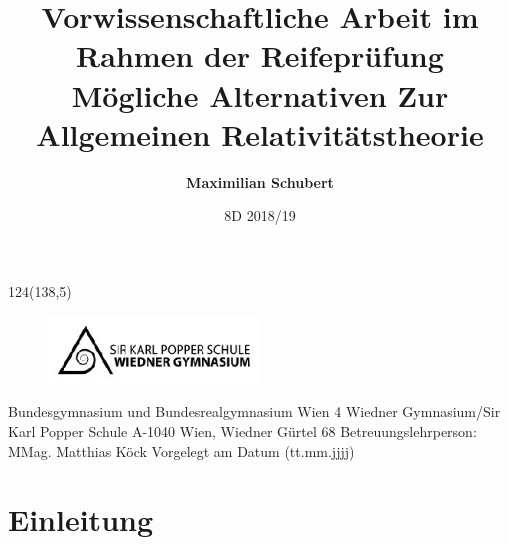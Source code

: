 \documentclass[a4paper,11pt]{article}
\author{\textbf{\Large{Maximilian Schubert}}}
\title{\large{Vorwissenschaftliche Arbeit im Rahmen der Reifeprüfung}\\\vspace{50mm}\textbf{\LARGE{Mögliche Alternativen Zur Allgemeinen Relativitätstheorie}}}
\date{\large{8D \hspace*{10mm} 2018/19}}
\begin{document}
\begin{titlingpage}
\singlespacing
\maketitle

\begin{textblock}{124}(138,5)
	\begin{figure}
	\includegraphics[width=160pt]{SKPLogo.eps}
	\end{figure}
\end{textblock}

\begin{center}
\vspace{96mm}
\large{
Bundesgymnasium und Bundesrealgymnasium Wien 4
\linebreak
Wiedner Gymnasium/Sir Karl Popper Schule
\linebreak
A-1040 Wien, Wiedner Gürtel 68
\vspace{10mm}
\linebreak
Betreuungslehrperson: MMag. Matthias Köck
\vspace{4mm}
\linebreak
Vorgelegt am Datum (tt.mm.jjjj)
}
\end{center}
\end{titlingpage}
\pagebreak
\begin{abstract}
    
\end{abstract}

\newpage

\begin{otherlanguage}{ngerman}
\tableofcontents
\end{otherlanguage}
\newpage

\section{Einleitung} 
\end{document}
